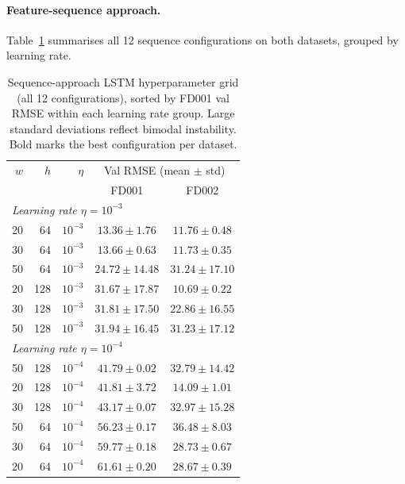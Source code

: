 \documentclass[a4paper,11pt]{article}
\begin{document}
\paragraph{Feature-sequence approach.}
Table~\ref{tab:hparam_seq} summarises all 12 sequence configurations on both datasets, grouped by learning rate.

\begin{table}[h]
    \centering
    \begin{tabular}{rrrcc}
        \hline
        $w$ & $h$ & $\eta$ & \multicolumn{2}{c}{Val RMSE (mean $\pm$ std)} \\
             &      &         & FD001 & FD002 \\
        \hline
        \multicolumn{5}{l}{\textit{Learning rate $\eta = 10^{-3}$}} \\
        20 & 64  & $10^{-3}$ & $\mathbf{13.36 \pm 1.76}$ & $11.76 \pm 0.48$ \\
        30 & 64  & $10^{-3}$ & $13.66 \pm 0.63$ & $11.73 \pm 0.35$ \\
        50 & 64  & $10^{-3}$ & $24.72 \pm 14.48$ & $31.24 \pm 17.10$ \\
        20 & 128 & $10^{-3}$ & $31.67 \pm 17.87$ & $\mathbf{10.69 \pm 0.22}$ \\
        30 & 128 & $10^{-3}$ & $31.81 \pm 17.50$ & $22.86 \pm 16.55$ \\
        50 & 128 & $10^{-3}$ & $31.94 \pm 16.45$ & $31.23 \pm 17.12$ \\
        \hline
        \multicolumn{5}{l}{\textit{Learning rate $\eta = 10^{-4}$}} \\
        50 & 128 & $10^{-4}$ & $41.79 \pm 0.02$ & $32.79 \pm 14.42$ \\
        20 & 128 & $10^{-4}$ & $41.81 \pm 3.72$ & $14.09 \pm 1.01$ \\
        30 & 128 & $10^{-4}$ & $43.17 \pm 0.07$ & $32.97 \pm 15.28$ \\
        50 & 64  & $10^{-4}$ & $56.23 \pm 0.17$ & $36.48 \pm 8.03$ \\
        30 & 64  & $10^{-4}$ & $59.77 \pm 0.18$ & $28.73 \pm 0.67$ \\
        20 & 64  & $10^{-4}$ & $61.61 \pm 0.20$ & $28.67 \pm 0.39$ \\
        \hline
    \end{tabular}
    \caption{Sequence-approach LSTM hyperparameter grid (all 12 configurations), sorted by FD001 val RMSE within each learning rate group. Large standard deviations reflect bimodal instability. Bold marks the best configuration per dataset.}
    \label{tab:hparam_seq}
\end{table}
\end{document}
